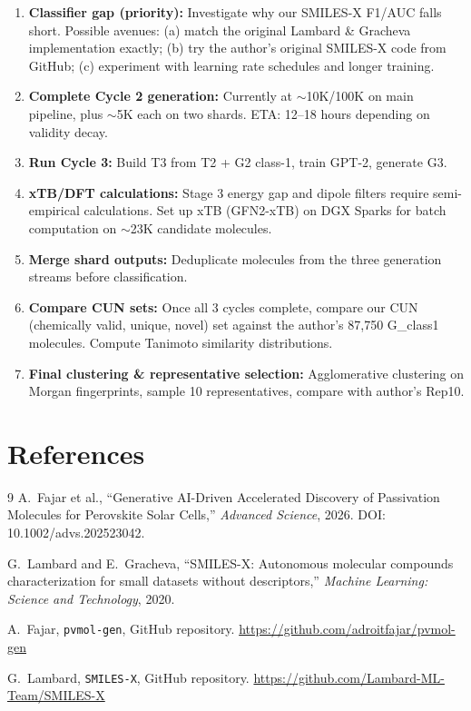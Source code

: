 \documentclass[11pt]{article}
\begin{document}
\begin{enumerate}[leftmargin=*]
    \item \textbf{Classifier gap (priority):} Investigate why our SMILES-X F1/AUC falls short. Possible avenues: (a) match the original Lambard \& Gracheva implementation exactly; (b) try the author's original SMILES-X code from GitHub; (c) experiment with learning rate schedules and longer training.

    \item \textbf{Complete Cycle 2 generation:} Currently at $\sim$10K/100K on main pipeline, plus $\sim$5K each on two shards. ETA: 12--18 hours depending on validity decay.

    \item \textbf{Run Cycle 3:} Build T3 from T2 + G2 class-1, train GPT-2, generate G3.

    \item \textbf{xTB/DFT calculations:} Stage 3 energy gap and dipole filters require semi-empirical calculations. Set up xTB (GFN2-xTB) on DGX Sparks for batch computation on $\sim$23K candidate molecules.

    \item \textbf{Merge shard outputs:} Deduplicate molecules from the three generation streams before classification.

    \item \textbf{Compare CUN sets:} Once all 3 cycles complete, compare our CUN (chemically valid, unique, novel) set against the author's 87,750 G\_class1 molecules. Compute Tanimoto similarity distributions.

    \item \textbf{Final clustering \& representative selection:} Agglomerative clustering on Morgan fingerprints, sample 10 representatives, compare with author's Rep10.
\end{enumerate}

\section*{References}

\begin{thebibliography}{9}
A.~Fajar et al.,
``Generative AI-Driven Accelerated Discovery of Passivation Molecules for Perovskite Solar Cells,''
\textit{Advanced Science}, 2026.
DOI: 10.1002/advs.202523042.

G.~Lambard and E.~Gracheva,
``SMILES-X: Autonomous molecular compounds characterization for small datasets without descriptors,''
\textit{Machine Learning: Science and Technology}, 2020.

A.~Fajar, \texttt{pvmol-gen}, GitHub repository.
\url{https://github.com/adroitfajar/pvmol-gen}

G.~Lambard, \texttt{SMILES-X}, GitHub repository.
\url{https://github.com/Lambard-ML-Team/SMILES-X}
\end{thebibliography}
\end{document}
